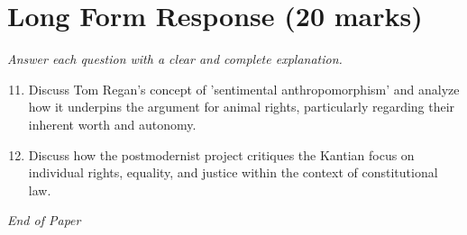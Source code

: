 \documentclass[12pt]{article}
\begin{document}
\section*{Long Form Response (20 marks)}
\textit{Answer each question with a clear and complete explanation.}
\begin{enumerate}[label=\arabic*.]
\setcounter{enumi}{10}
\item Discuss Tom Regan's concept of 'sentimental anthropomorphism' and analyze how it underpins the argument for animal rights, particularly regarding their inherent worth and autonomy.
\item Discuss how the postmodernist project critiques the Kantian focus on individual rights, equality, and justice within the context of constitutional law.
\end{enumerate}

\vfill
\noindent\textit{End of Paper}
\end{document}
